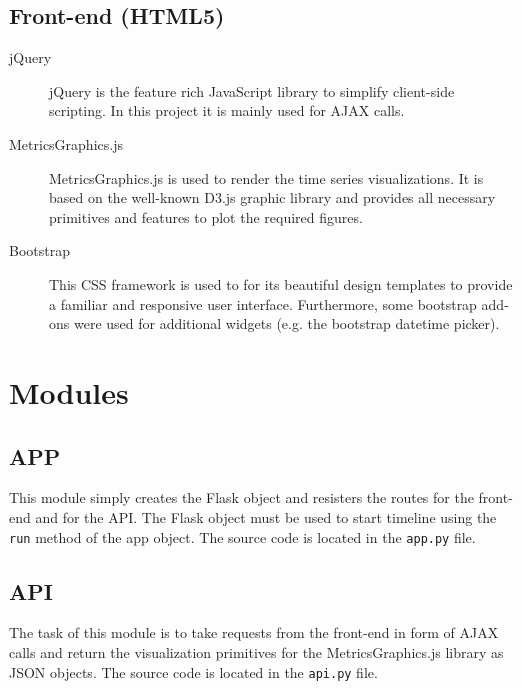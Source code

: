 \documentclass[11pt, a4paper]{article}
\begin{document}
\subsection{Front-end (HTML5)}

\begin{description}
 \item[jQuery] jQuery is the feature rich JavaScript library to simplify client-side scripting. 
 In this project it is mainly used for AJAX calls.
 \item[MetricsGraphics.js] MetricsGraphics.js is used to render the time series visualizations.
 It is based on the well-known D3.js graphic library and provides all necessary primitives and features to plot the required figures.
 \item[Bootstrap] This CSS framework is used to for its beautiful design templates to provide a familiar and responsive user interface.
 Furthermore, some bootstrap add-ons were used for additional widgets (e.g. the bootstrap datetime picker).
\end{description}


\section{Modules}\label{sec:modules}

\subsection{APP}
This module simply creates the Flask object and resisters the routes for the front-end and for the API.
The Flask object must be used to start timeline using the \texttt{run} method of the app object. 
The source code is located in the \texttt{app.py} file.

\subsection{API}
The task of this module is to take requests from the front-end in form of AJAX calls and return the visualization primitives for the MetricsGraphics.js library as JSON objects.
The source code is located in the \texttt{api.py} file.
\end{document}

